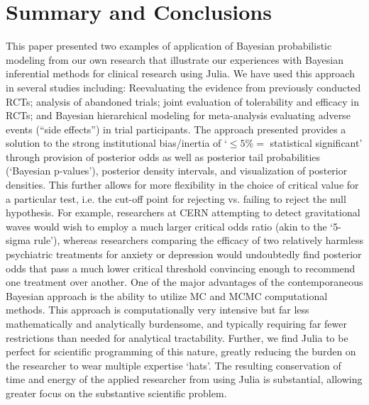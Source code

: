 \documentclass{juliacon}
\begin{document}
\section{Summary and Conclusions}
This paper presented two examples of application of Bayesian probabilistic modeling from our own research that illustrate our experiences with Bayesian inferential methods for clinical research using Julia.  We have used this approach in several studies including: Reevaluating the evidence from previously conducted RCTs; analysis of abandoned trials; joint evaluation of tolerability and efficacy in RCTs; and Bayesian hierarchical modeling for meta-analysis evaluating adverse events (“side effects”) in trial participants.
\vskip 6pt
The approach presented provides a solution to the strong institutional bias/inertia of `$\le 5\% =$ statistical significant’ through provision of posterior odds as well as posterior tail probabilities (`Bayesian p-values’), posterior density intervals, and visualization of posterior densities. This further allows for more flexibility in the choice of critical value for a particular test, i.e. the cut-off point for rejecting vs. failing to reject the null hypothesis.  For example, researchers at CERN attempting to detect gravitational waves would wish to employ a much larger critical odds ratio (akin to the `5-sigma rule'), whereas researchers comparing the efficacy of two relatively harmless psychiatric treatments for anxiety or depression would undoubtedly find posterior odds that pass a much lower critical threshold convincing enough to recommend one treatment over another.  
\vskip 6pt
One of the major advantages of the contemporaneous Bayesian approach is 
the ability to utilize MC and MCMC computational methods. This approach is computationally very intensive but far less mathematically and analytically burdensome, and typically requiring far fewer restrictions than needed for analytical tractability.  Further, we find Julia to be  perfect for scientific programming of this nature, greatly reducing the burden on the researcher to wear multiple expertise `hats'. The resulting conservation of time and energy of the applied researcher from using Julia is substantial, allowing greater focus on the substantive scientific problem.




%
\end{document}
